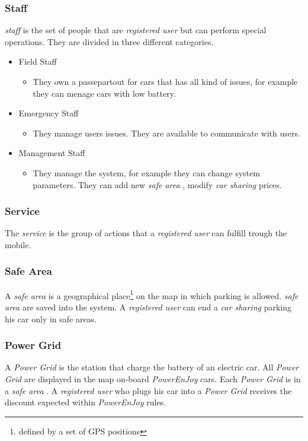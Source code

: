 \documentclass[english]{article}
\newcommand{\carsharing}{\textit {car sharing }}
\newcommand{\powerenjoy}{\textit{PowerEnJoy }}
\newcommand{\registereduser}{\textit {registered user }}
\newcommand{\staff}{\textit{staff }}
\newcommand{\service}{\textit{service }}
\newcommand{\safearea}{\textit{safe area }}
\newcommand{\powergrid}{\textit{Power Grid }}
\begin{document}
		\subsubsection{Staff}
			\staff is the set of people that are \registereduser but can perform special operations. They are divided in three different categories.
			\begin{itemize}
				\item {Field Staff}
				\begin{itemize}
				\item They own a passepartout for cars that has all kind of issues, for example they can menage cars with low battery.
				\end{itemize}
				\item{Emergency Staff}
				\begin{itemize}
				\item They manage users issues. They are available to communicate with users.
				\end{itemize}
				\item{Management Staff}
				\begin{itemize}
				\item They manage the system, for example they can change system parameters. They can add new \safearea, modify \carsharing prices.
				\end{itemize}
			\end{itemize}
		\subsubsection{Service}
			The \service is the group of actions that a \registereduser can fulfill trough the mobile.	
		\subsubsection {Safe Area}
			A \safearea is a  geographical place\footnote{defined by a set of GPS positions} on the map in which parking is allowed. \safearea are saved into the system. A \registereduser can end a \carsharing parking his car only in safe areas.
	\subsubsection{Power Grid}
		A \powergrid is the station that charge the battery of an electric car. All \powergrid are displayed in the map on-board \powerenjoy cars. Each \powergrid is in a \safearea. A \registereduser who plugs his car into a \powergrid receives the discount expected within \powerenjoy rules.
\end{document}
